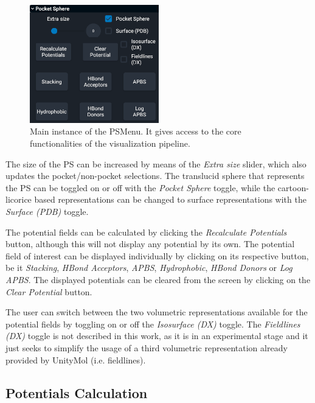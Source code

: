     \begin{figure}[H]
      \centering
      \includegraphics[width=0.5\textwidth]{figures/methods/umol_ps-main.png}
      \caption{\label{fig:methods/umol_ps-main} Main instance of the PSMenu. It gives access to the core functionalities of the visualization pipeline.}
    \end{figure}

    The size of the PS can be increased by means of the \textit{Extra size} slider, which also updates the pocket/non-pocket selections. The translucid sphere that represents the PS can be toggled on or off with the \textit{Pocket Sphere} toggle, while the cartoon-licorice based representations can be changed to surface representations with the \textit{Surface (PDB)} toggle.

    The potential fields can be calculated by clicking the \textit{Recalculate Potentials} button, although this will not display any potential by its own. The potential field of interest can be displayed individually by clicking on its respective button, be it \textit{Stacking}, \textit{HBond Acceptors}, \textit{APBS}, \textit{Hydrophobic}, \textit{HBond Donors} or \textit{Log APBS}. The displayed potentials can be cleared from the screen by clicking on the \textit{Clear Potential} button.

    The user can switch between the two volumetric representations available for the potential fields by toggling on or off the \textit{Isosurface (DX)} toggle. The \textit{Fieldlines (DX)} toggle is not described in this work, as it is in an experimental stage and it just seeks to simplify the usage of a third volumetric representation already provided by UnityMol (i.e. fieldlines).

  \subsection{Potentials Calculation}
